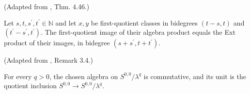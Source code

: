 \begin{theorem}
\label{frontier:Literature:a0113c9a3b80}
(Adapted from \cite{Pst}, Thm. 4.46.)\par{}

Let $s,t,s^{\prime},t^{\prime}\in\mathbb N$ and let $x,y$ be first-quotient classes in bidegrees $(t-s,t)$ and $(t^{\prime}-s^{\prime},t^{\prime})$. The first-quotient image of their algebra product equals the Ext product of their images, in bidegree $(s+s^{\prime},t+t^{\prime})$.

(Adapted from \cite{LWX126}, Remark 3.4.)\par{}

For every $q>0$, the chosen algebra on $S^{0,0}/\lambda^q$ is commutative, and its unit is the quotient inclusion $S^{0,0}\to S^{0,0}/\lambda^q$.
\end{theorem}

